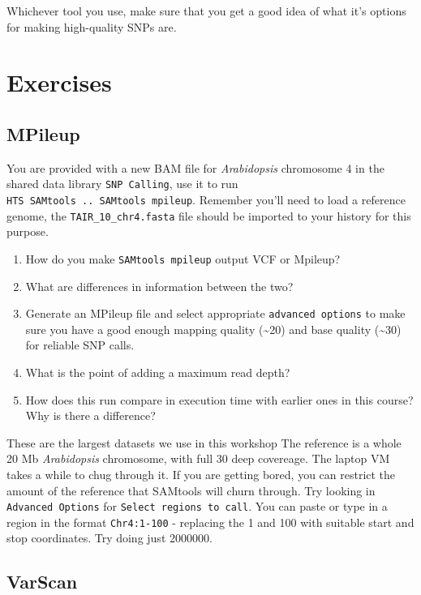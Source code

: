 \documentclass[12pt,]{book}
\providecommand{\tightlist}{%
  \setlength{\itemsep}{0pt}\setlength{\parskip}{0pt}}
\begin{document}
Whichever tool you use, make sure that you get a good idea of what it's
options for making high-quality SNPs are.

\section{Exercises}\label{exercises-2}

\subsection{MPileup}\label{mpileup-1}

You are provided with a new BAM file for \emph{Arabidopsis} chromosome 4
in the shared data library \texttt{SNP\ Calling}, use it to run
\texttt{HTS\ SAMtools\ ..\ SAMtools\ mpileup}. Remember you'll need to
load a reference genome, the \texttt{TAIR\_10\_chr4.fasta} file should
be imported to your history for this purpose.

\begin{enumerate}
\def\labelenumi{\arabic{enumi}.}
\tightlist
\item
  How do you make \texttt{SAMtools\ mpileup} output VCF or Mpileup?
\item
  What are differences in information between the two?
\item
  Generate an MPileup file and select appropriate
  \texttt{advanced\ options} to make sure you have a good enough mapping
  quality (\textasciitilde{}20) and base quality (\textasciitilde{}30)
  for reliable SNP calls.\\
\item
  What is the point of adding a maximum read depth?
\item
  How does this run compare in execution time with earlier ones in this
  course? Why is there a difference?
\end{enumerate}

These are the largest datasets we use in this workshop The reference is
a whole 20 Mb \emph{Arabidopsis} chromosome, with full 30 deep
covereage. The laptop VM takes a while to chug through it. If you are
getting bored, you can restrict the amount of the reference that
SAMtools will churn through. Try looking in \texttt{Advanced\ Options}
for \texttt{Select\ regions\ to\ call}. You can paste or type in a
region in the format \texttt{Chr4:1-100} - replacing the 1 and 100 with
suitable start and stop coordinates. Try doing just 2000000.

\subsection{VarScan}\label{varscan}
\end{document}
